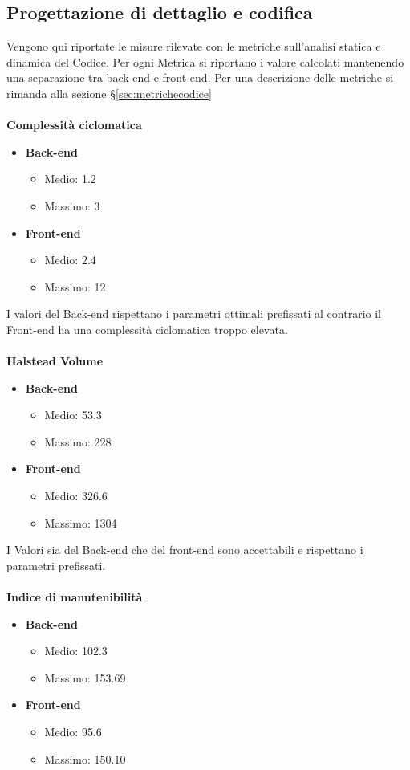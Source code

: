 \subsection{Progettazione di dettaglio e codifica}
Vengono qui riportate le misure rilevate con le metriche sull’analisi statica e dinamica del Codice. Per ogni Metrica si riportano i valore calcolati mantenendo una separazione tra back end e front-end. Per una descrizione delle metriche si rimanda alla sezione \S\ref{sec:metrichecodice}\\\\
\textbf{Complessità ciclomatica}
\begin{itemize}
\item \textbf{Back-end}
\begin{itemize}
\item Medio: 1.2
\item Massimo: 3
\end{itemize}
\item \textbf{Front-end}
\begin{itemize}
\item Medio: 2.4
\item Massimo: 12
\end{itemize}
\end{itemize}
I valori del Back-end rispettano i parametri ottimali prefissati al contrario il Front-end ha una complessità ciclomatica troppo elevata.
\\\\
\textbf{Halstead Volume}
\begin{itemize}
\item \textbf{Back-end}
\begin{itemize}
\item Medio: 53.3
\item Massimo: 228
\end{itemize}
\item \textbf{Front-end}
\begin{itemize}
\item Medio: 326.6
\item Massimo: 1304
\end{itemize}
\end{itemize}
I Valori sia del Back-end che del front-end sono accettabili e rispettano i parametri prefissati.
\\\\
\textbf{Indice di manutenibilità}
\begin{itemize}
\item \textbf{Back-end}
\begin{itemize}
\item Medio: 102.3
\item Massimo: 153.69
\end{itemize}
\item \textbf{Front-end}
\begin{itemize}
\item Medio: 95.6
\item Massimo: 150.10
\end{itemize}
\end{itemize}
